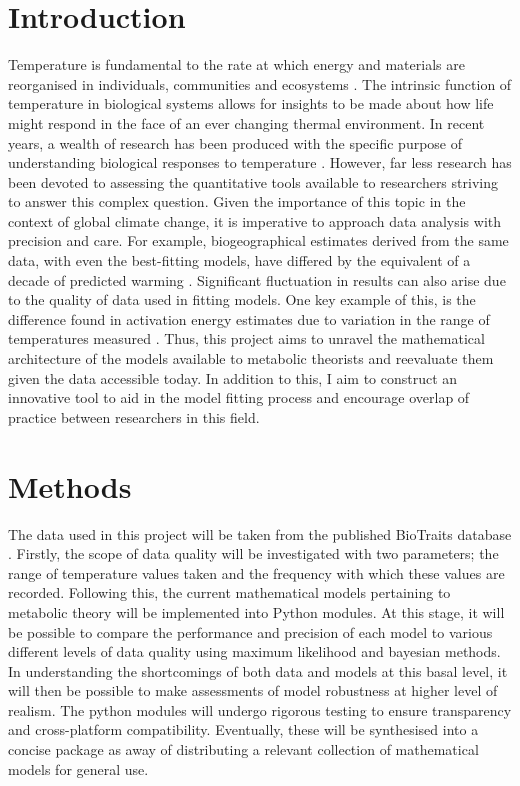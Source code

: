 \documentclass[
11pt, %
onehalfspacing, %
parskip, %
headsepline, %
]{article} %
\begin{document}
\maketitle
\section*{Introduction}
Temperature is fundamental to the rate at which energy and materials are reorganised in individuals, communities and ecosystems \citep{Brown2004}. The intrinsic function of temperature in biological systems allows for insights to be made about how life might respond in the face of an ever changing thermal environment. In recent years, a wealth of research has been produced with the specific purpose of understanding biological responses to temperature \citep{Dell2011} \citep{Thomas2012}. However, far less research has been devoted to assessing the quantitative tools available to researchers striving to answer this complex question. Given the importance of this topic in the context of global climate change, it is imperative to approach data analysis with precision and care. For example, biogeographical estimates derived from the same data, with even the best-fitting models, have differed by the equivalent of a decade of predicted warming \citep{Low-Decarie2017}. Significant fluctuation in results can also arise due to the quality of data used in fitting models. One key example of this, is the difference found in activation energy estimates due to variation in the range of temperatures measured \citep{Pawar2016}.
Thus, this project aims to unravel the mathematical architecture of the models available to metabolic theorists and reevaluate them given the data accessible today. In addition to this, I aim to construct an innovative tool to aid in the model fitting process and encourage overlap of practice between researchers in this field.

\maketitle
\section*{Methods}
The data used in this project will be taken from the published BioTraits database \citep{Dell2013}. Firstly, the scope of data quality will be investigated with two parameters; the range of temperature values taken and the frequency with which these values are recorded. Following this, the current mathematical models pertaining to metabolic theory will be implemented into Python modules. At this stage, it will be possible to compare the performance and precision of each model to various different levels of data quality using maximum likelihood and bayesian methods. In understanding the shortcomings of both data and models at this basal level, it will then be possible to make assessments of model robustness at higher level of realism. The python modules will undergo rigorous testing to ensure transparency and cross-platform compatibility. Eventually, these will be synthesised into a concise package as away of distributing a relevant collection of mathematical models for general use.
\end{document}
